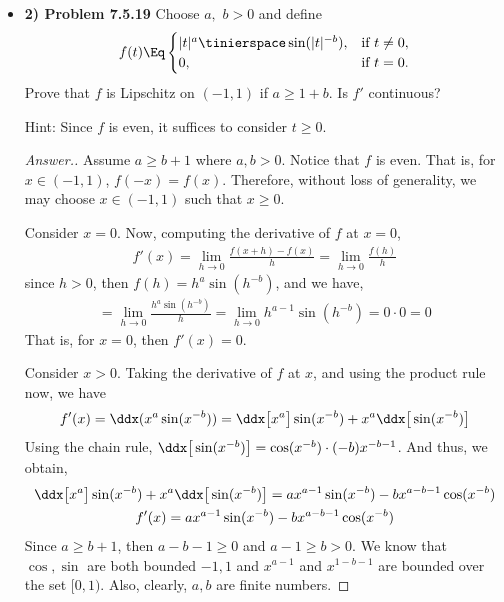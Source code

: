 \documentclass[10pt,twoside]{article}
\begin{document}
\begin{itemize}
\begin{proof}[Answer.]
    \[|x-y|< \delta\] 
    and 
    \[|h(x) - h(y)| \geq \epsilon\]
    
    Thus, we have shown that $h$ is continuous but not uniformly continuous.
    
    \end{proof}
    
    \item\textbf{2) Problem 7.5.19} \newline
    \noindent\makebox[\linewidth]{\rule{18cm}{0.4pt}}
    Choose $a,$ $b > 0$ and define
$$f(t)
\Eq \begin{cases}
    |t|^a \tinierspace \sin(|t|^{-b}), & \text{if } t \ne 0, \\
    0, & \text{if } t = 0.
    \end{cases}$$
Prove that $f$ is Lipschitz on $(-1,1)$ if $a \ge 1+b.$
Is $f'$ continuous?

Hint: Since $f$ is even, it suffices to consider $t \ge 0.$
    \begin{proof}[Answer.]
    Assume $a\geq b+1$ where $a,b>0$. Notice that $f$ is even. That is, for $x\in (-1,1) $, \newline
    $f(-x) = f(x)$. Therefore, without loss of generality, we may choose $x\in(-1,1)$ such that $x\geq 0$. 
    
    Consider $x = 0$. Now, computing the derivative of $f$ at $x = 0$, 
    \begin{gather*}
        f'(x) = \lim_{h\to 0}\frac{f(x+h) - f(x)}{h} = \lim_{h\to 0}\frac{f(h)}{h}
    \end{gather*}
    since $h>0$, then $f(h) = h^a\sin(h^{-b})$, and we have,
    \begin{gather*}
        = \lim_{h\to 0}\frac{h^a\sin(h^{-b})}{h} = \lim_{h\to 0}h^{a-1}\sin(h^{-b}) = 0 \cdot 0 = 0
    \end{gather*}
    That is, for $x= 0$, then $f'(x) = 0$.\smallskip
    
    Consider $x>0$. Taking the derivative of $f$ at $x$, and using the product rule now, we have
    \begin{gather*}
        f'(x) = \ddx(x^a\sin(x^{-b})) = \ddx\big[x^a\big]\sin(x^{-b}) + x^a\ddx\big[\sin(x^{-b})\big]
    \end{gather*}
    Using the chain rule, $\ddx\big[\sin(x^{-b})\big] = \cos(x^{-b})\cdot (-b)x^{-b-1}$. And thus, we obtain,
    \begin{gather*}
        \ddx\big[x^a\big]\sin(x^{-b}) + x^a\ddx\big[\sin(x^{-b})\big] = ax^{a-1}\sin(x^{-b}) - bx^{a-b-1}\cos(x^{-b}) \\
        f'(x) = ax^{a-1}\sin(x^{-b}) - bx^{a-b-1}\cos(x^{-b})
    \end{gather*}
    Since $a\geq b+1$, then $a - b - 1\geq 0$ and $a - 1 \geq b > 0$. We know that $\cos,\sin$ are both bounded $-1,1$ and $x^{a-1}$ and $x^{1-b-1}$ are bounded over the set $[0,1)$. Also, clearly, $a,b$ are finite numbers.\smallskip
    

\end{proof}
\end{itemize}
\end{document}
